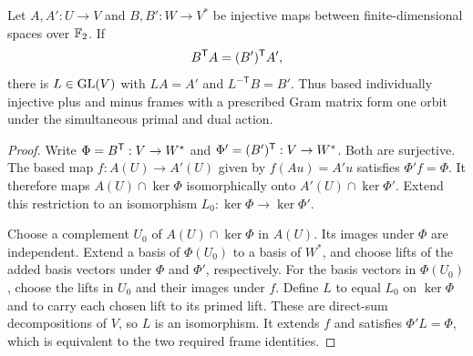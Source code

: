 \begin{lemma}\label{lem:paired-frame-orbit}
Let \(A,A':U\to V\) and \(B,B':W\to V^*\) be injective maps between finite-dimensional spaces over \(\mathbb F_2\).
If
\[
 B^{\mathsf T} A=(B')^{\mathsf T} A',
\]
there is \(L\in\operatorname{GL}(V)\) with \(LA=A'\) and \(L^{-\mathsf T}B=B'\).
Thus based individually injective plus and minus frames with a prescribed Gram matrix form one orbit under the simultaneous primal and dual action.
\end{lemma}
\begin{proof}
Write \(\Phi=B^{\mathsf T}:V\to W^*\) and \(\Phi'=(B')^{\mathsf T}:V\to W^*\).
Both are surjective.
The based map \(f:A(U)\to A'(U)\) given by \(f(Au)=A'u\) satisfies \(\Phi'f=\Phi\).
It therefore maps \(A(U)\cap\ker\Phi\) isomorphically onto \(A'(U)\cap\ker\Phi'\).
Extend this restriction to an isomorphism \(L_0:\ker\Phi\to\ker\Phi'\).

Choose a complement \(U_0\) of \(A(U)\cap\ker\Phi\) in \(A(U)\).
Its images under \(\Phi\) are independent.
Extend a basis of \(\Phi(U_0)\) to a basis of \(W^*\), and choose lifts of the added basis vectors under \(\Phi\) and \(\Phi'\), respectively.
For the basis vectors in \(\Phi(U_0)\), choose the lifts in \(U_0\) and their images under \(f\).
Define \(L\) to equal \(L_0\) on \(\ker\Phi\) and to carry each chosen lift to its primed lift.
These are direct-sum decompositions of \(V\), so \(L\) is an isomorphism.
It extends \(f\) and satisfies \(\Phi'L=\Phi\), which is equivalent to the two required frame identities.
\end{proof}

